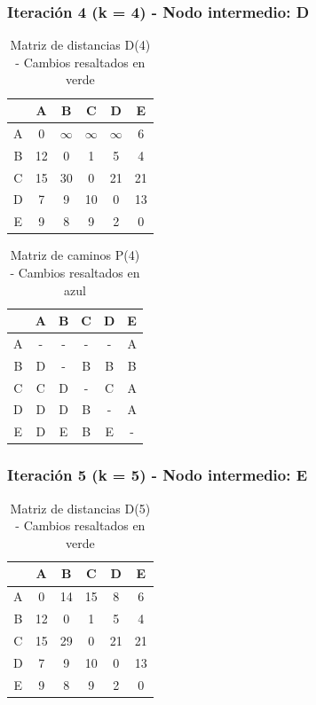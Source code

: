 \documentclass[12pt]{article}
\begin{document}
\subsubsection{Iteración 4 (k = 4) - Nodo intermedio: D}
\begin{table}[h!]
\centering
\begin{tabular}{|c|c|c|c|c|c|}
\hline
 & A & B & C & D & E \\\hline
A & 0 & $\infty$ & $\infty$ & $\infty$ & 6 \\\hline
B & \cellcolor{lightgreen} 12 & 0 & 1 & 5 & 4 \\\hline
C & 15 & \cellcolor{lightgreen} 30 & 0 & 21 & 21 \\\hline
D & 7 & 9 & 10 & 0 & 13 \\\hline
E & \cellcolor{lightgreen} 9 & 8 & 9 & 2 & 0 \\\hline
\end{tabular}
\caption{Matriz de distancias D(4) - Cambios resaltados en verde}
\end{table}

\begin{table}[h!]
\centering
\begin{tabular}{|c|c|c|c|c|c|}
\hline
 & A & B & C & D & E \\\hline
A & - & - & - & - & A \\\hline
B & \cellcolor{lightblue} D & - & B & B & B \\\hline
C & C & \cellcolor{lightblue} D & - & C & A \\\hline
D & D & D & B & - & A \\\hline
E & \cellcolor{lightblue} D & E & B & E & - \\\hline
\end{tabular}
\caption{Matriz de caminos P(4) - Cambios resaltados en azul}
\end{table}

\subsubsection{Iteración 5 (k = 5) - Nodo intermedio: E}
\begin{table}[h!]
\centering
\begin{tabular}{|c|c|c|c|c|c|}
\hline
 & A & B & C & D & E \\\hline
A & 0 & \cellcolor{lightgreen} 14 & \cellcolor{lightgreen} 15 & \cellcolor{lightgreen} 8 & 6 \\\hline
B & 12 & 0 & 1 & 5 & 4 \\\hline
C & 15 & \cellcolor{lightgreen} 29 & 0 & 21 & 21 \\\hline
D & 7 & 9 & 10 & 0 & 13 \\\hline
E & 9 & 8 & 9 & 2 & 0 \\\hline
\end{tabular}
\caption{Matriz de distancias D(5) - Cambios resaltados en verde}
\end{table}
\end{document}
